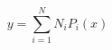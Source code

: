 \documentclass{article}
\begin{document}
\begin{equation}
  y=\sum_{i=1}^{N} N_i P_i(x)
\end{equation}
\end{document}
